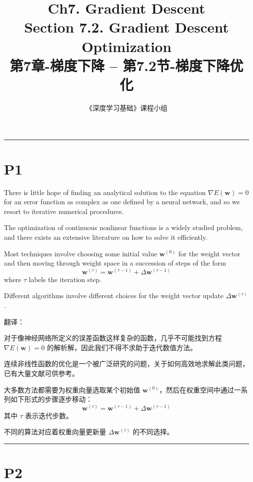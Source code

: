 \documentclass{article}
\title{Ch7. Gradient Descent \\ 
Section 7.2. Gradient Descent Optimization\\
第7章-梯度下降 -- 第7.2节-梯度下降优化}
\author{《深度学习基础》课程小组}
\begin{document}
\maketitle

\setlength{\parindent}{0pt} %
\setlength{\parskip}{1.5em} %

\noindent\rule{\linewidth}{0.4pt}

\section{P1}

There is little hope of finding an analytical solution to the equation $\nabla E(\mathbf{w}) = 0$ for an error function as complex as one defined by a neural network, and so we resort to iterative numerical procedures. 

The optimization of continuous nonlinear functions is a widely studied problem, and there exists an extensive literature on how to solve it efficiently. 

Most techniques involve choosing some initial value $\mathbf{w}^{(0)}$ for the weight vector and then moving through weight space in a succession of steps of the form
\begin{equation}
\mathbf{w}^{(\tau)} = \mathbf{w}^{(\tau-1)} + \Delta \mathbf{w}^{(\tau-1)}
\tag{7.15}
\end{equation}
where $\tau$ labels the iteration step. 

Different algorithms involve different choices for the weight vector update $\Delta \mathbf{w}^{(\tau)}$.

{\color{red}
翻译：

对于像神经网络所定义的误差函数这样复杂的函数，几乎不可能找到方程 $\nabla E(\mathbf{w}) = 0$ 的解析解，因此我们不得不求助于迭代数值方法。

连续非线性函数的优化是一个被广泛研究的问题，关于如何高效地求解此类问题，已有大量文献可供参考。

大多数方法都需要为权重向量选取某个初始值 $\mathbf{w}^{(0)}$，然后在权重空间中通过一系列如下形式的步骤逐步移动：
$$\mathbf{w}^{(\tau)} = \mathbf{w}^{(\tau-1)} + \Delta \mathbf{w}^{(\tau-1)}$$
其中 $\tau$ 表示迭代步数。

不同的算法对应着权重向量更新量 $\Delta \mathbf{w}^{(\tau)}$ 的不同选择。
}

\noindent\rule{\linewidth}{0.4pt}

\section{P2}
\end{document}
